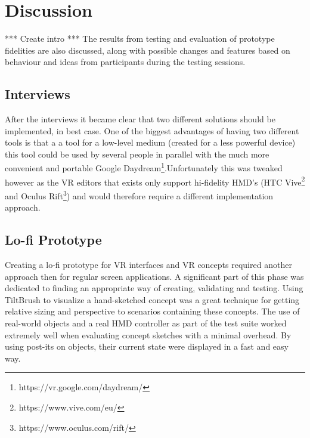 
\chapter{Discussion}
\label{discussion}
*** Create intro ***
The results from testing and evaluation of prototype fidelities are also discussed, along with possible changes and features based on behaviour and ideas from participants during the testing sessions.
\section{Interviews}
After the interviews it became clear that two different solutions should be implemented, in best case. One of the biggest advantages of having two different tools is that a a tool for a low-level medium (created for a less powerful device) this tool could be used by several people in parallel with the much more convenient and portable Google Daydream\footnote{https://vr.google.com/daydream/}.Unfortunately this was tweaked however as the VR editors that exists only support hi-fidelity HMD's (HTC Vive\footnote{https://www.vive.com/eu/} and Oculus Rift\footnote{https://www.oculus.com/rift/}) and would therefore require a different implementation approach.

\section{Lo-fi Prototype}
Creating a lo-fi prototype for VR interfaces and VR concepts required another approach then for regular screen applications. A significant part of this phase was dedicated to finding an appropriate way of creating, validating and testing. Using TiltBrush to visualize a hand-sketched concept was a great technique for getting relative sizing and perspective to scenarios containing these concepts. The use of real-world objects and a real HMD controller as part of the test suite worked extremely well when evaluating concept sketches with a minimal overhead. By using post-its on objects, their current state were displayed in a fast and easy way.

